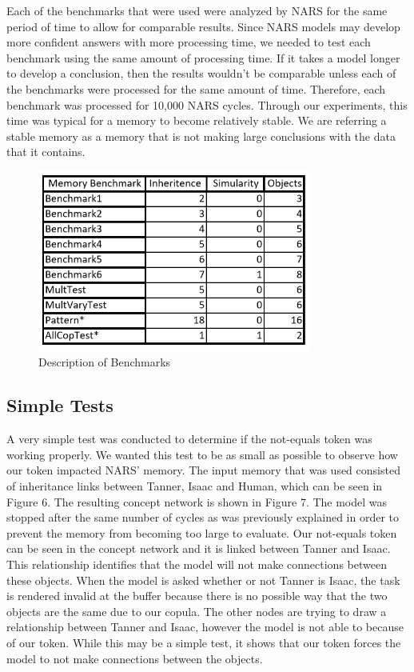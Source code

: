 \documentclass[conference]{IEEEtran}
\begin{document}
	Each of the benchmarks that were used were analyzed by NARS for the same period of time to allow for comparable results. Since NARS models may develop more confident answers with more processing time, we needed to test each benchmark using the same amount of processing time. If it takes a model longer to develop a conclusion, then the results wouldn't be comparable unless each of the benchmarks were processed for the same amount of time. Therefore, each benchmark was processed for 10,000 NARS cycles. Through our experiments, this time was typical for a memory to become relatively stable. We are referring a stable memory as a memory that is not making large conclusions with the data that it contains.

\begin{figure}[ht!]
\centering
\includegraphics[width=90mm]{BenchmarkTable.png}
\caption{Description of Benchmarks \label{overflow}}
\end{figure}	

\subsection{Simple Tests}
	A very simple test was conducted to determine if the not-equals token was working properly. We wanted this test to be as small as possible to observe how our token impacted NARS' memory. The input memory that was used consisted of inheritance links between Tanner, Isaac and Human, which can be seen in Figure 6. The resulting concept network is shown in Figure 7. The model was stopped after the same number of cycles as was previously explained in order to prevent the memory from becoming too large to evaluate. Our not-equals token can be seen in the concept network and it is linked between Tanner and Isaac. This relationship identifies that the model will not make connections between these objects. When the model is asked whether or not Tanner is Isaac, the task is rendered invalid at the buffer because there is no possible way that the two objects are the same due to our copula. The other nodes are trying to draw a relationship between Tanner and Isaac, however the model is not able to because of our token. While this may be a simple test, it shows that our token forces the model to not make connections between the objects.
\end{document}
